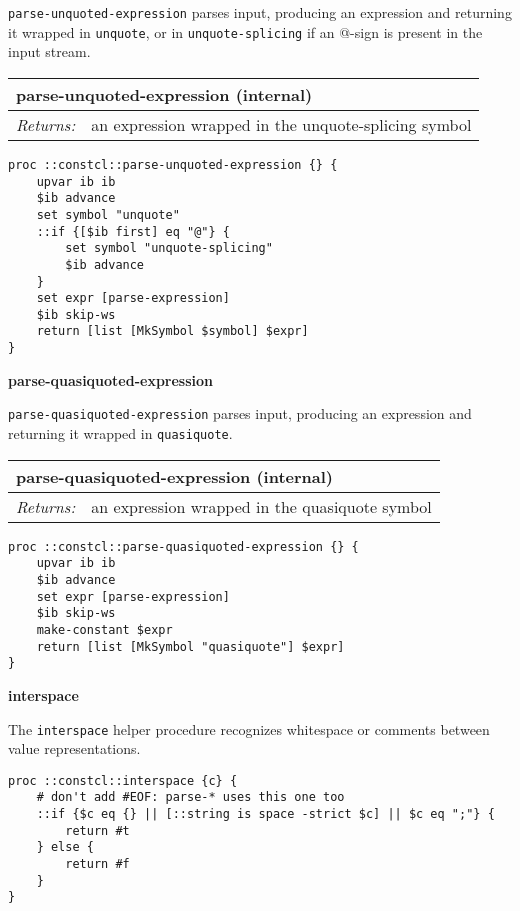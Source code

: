 \documentclass{report}
\begin{document}
\texttt{parse-unquoted-expression} parses input, producing an expression and returning it wrapped in \texttt{unquote}, or in \texttt{unquote-splicing} if an @-sign is present in the input stream.

\begin{tabular}{ |l l| }
\hline
\multicolumn{2}{|l|}{parse-unquoted-expression (internal)} \\
\hline
\textit{Returns:} & an expression wrapped in the unquote-splicing symbol \\
\hline
\end{tabular}

\noindent\makebox[\linewidth]{\rule{\linewidth}{0.4pt}}
\begin{lstlisting}
proc ::constcl::parse-unquoted-expression {} {
    upvar ib ib
    $ib advance
    set symbol "unquote"
    ::if {[$ib first] eq "@"} {
        set symbol "unquote-splicing"
        $ib advance
    }
    set expr [parse-expression]
    $ib skip-ws
    return [list [MkSymbol $symbol] $expr]
}
\end{lstlisting}
\noindent\makebox[\linewidth]{\rule{\linewidth}{0.4pt}}

\textbf{parse-quasiquoted-expression}


\texttt{parse-quasiquoted-expression} parses input, producing an expression and returning it wrapped in \texttt{quasiquote}.

\begin{tabular}{ |l l| }
\hline
\multicolumn{2}{|l|}{parse-quasiquoted-expression (internal)} \\
\hline
\textit{Returns:} & an expression wrapped in the quasiquote symbol \\
\hline
\end{tabular}

\noindent\makebox[\linewidth]{\rule{\linewidth}{0.4pt}}
\begin{lstlisting}
proc ::constcl::parse-quasiquoted-expression {} {
    upvar ib ib
    $ib advance
    set expr [parse-expression]
    $ib skip-ws
    make-constant $expr
    return [list [MkSymbol "quasiquote"] $expr]
}
\end{lstlisting}
\noindent\makebox[\linewidth]{\rule{\linewidth}{0.4pt}}

\textbf{interspace}


The \texttt{interspace} helper procedure recognizes whitespace or comments between value representations.

\noindent\makebox[\linewidth]{\rule{\linewidth}{0.4pt}}
\begin{lstlisting}
proc ::constcl::interspace {c} {
    # don't add #EOF: parse-* uses this one too
    ::if {$c eq {} || [::string is space -strict $c] || $c eq ";"} {
        return #t
    } else {
        return #f
    }
}
\end{lstlisting}
\noindent\makebox[\linewidth]{\rule{\linewidth}{0.4pt}}
\end{document}
